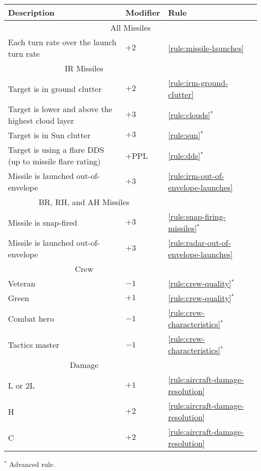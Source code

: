 {\begin{twocolumntable}
\begin{tabularx}{0.7\linewidth}{Xll}
\toprule
Description&Modifier&Rule\\
\midrule
\multicolumn{3}{c}{All Missiles}\\
\midrule
Each turn rate over the launch turn rate&$+2$&\ref{rule:missile-launches}\\
\midrule
\multicolumn{2}{c}{IR Missiles}\\
\midrule
Target is in ground clutter&$+2$&\ref{rule:irm-ground-clutter}\\
Target is lower and above the highest cloud layer&$+3$&\ref{rule:clouds}$^*$
\\
Target is in Sun clutter&$+3$&\ref{rule:sun}$^*$\\
Target is using a flare DDS (up to missile flare rating)&$+$PPL&\ref{rule:dds}$^*$\\
Missile is launched out-of-envelope&$+3$&\ref{rule:irm-out-of-envelope-launches}\\
\midrule
\multicolumn{2}{c}{BR, RH, and AH Missiles}\\
\midrule
Missile is snap-fired&$+3$&\ref{rule:snap-firing-missiles}$^*$\\
Missile is launched out-of-envelope&$+3$&\ref{rule:radar-out-of-envelope-launches}\\
\midrule
\multicolumn{2}{c}{Crew}\\
\midrule
Veteran&$-1$&\ref{rule:crew-quality}$^*$\\
Green&$+1$&\ref{rule:crew-quality}$^*$\\
Combat hero&$-1$&\ref{rule:crew-characteristics}$^*$\\
Tactics master&$-1$&\ref{rule:crew-characteristics}$^*$\\
\midrule
\multicolumn{2}{c}{Damage}\\
\midrule
L or 2L&$+1$&\ref{rule:aircraft-damage-resolution}\\
H&$+2$&\ref{rule:aircraft-damage-resolution}\\
C&$+2$&\ref{rule:aircraft-damage-resolution}\\
\bottomrule
\end{tabularx}
\begin{tablenote}{0.7\linewidth}
$^*$ Advanced rule.
\end{tablenote}
\end{twocolumntable}
}

